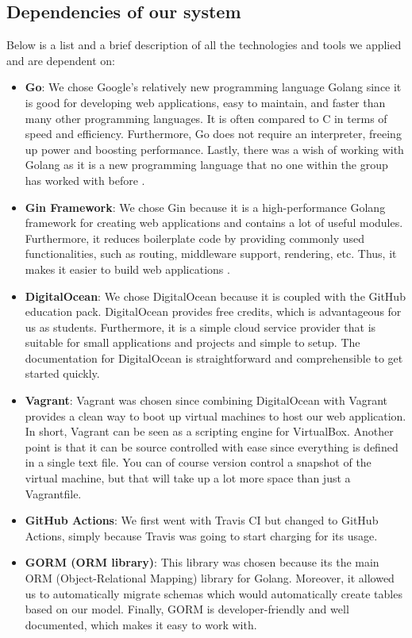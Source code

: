 \subsection{Dependencies of our system}
Below is a list and a brief description of all the technologies and tools we applied and are dependent on:

\begin{itemize}
    \item \textbf{Go}: We chose Google's relatively new programming language Golang since it is good for developing web applications, easy to maintain, and faster than many other programming languages. It is often compared to C in terms of speed and efficiency. Furthermore, Go does not require an interpreter, freeing up power and boosting performance. Lastly, there was a wish of working with Golang as it is a new programming language that no one within the group has worked with before \cite{whyusego}.
    \item \textbf{Gin Framework}: We chose Gin because it is a high-performance Golang framework for creating web applications and contains a lot of useful modules. Furthermore, it reduces boilerplate code by providing commonly used functionalities, such as routing, middleware support, rendering, etc. Thus, it makes it easier to build web applications \cite{gin}. 
    \item \textbf{DigitalOcean}: We chose DigitalOcean because it is coupled with the GitHub education pack. DigitalOcean provides free credits, which is advantageous for us as students. Furthermore, it is a simple cloud service provider that is suitable for small applications and projects and simple to setup. The documentation for DigitalOcean is straightforward and comprehensible to get started quickly. 
    \item \textbf{Vagrant}: Vagrant was chosen since combining DigitalOcean with Vagrant provides a clean way to boot up virtual machines to host our web application. In short, Vagrant can be seen as a scripting engine for VirtualBox. Another point is that it can be source controlled with ease since everything is defined in a single text file. You can of course version control a snapshot of the virtual machine, but that will take up a lot more space than just a Vagrantfile.
    \item \textbf{GitHub Actions}: We first went with Travis CI but changed to GitHub Actions, simply because Travis was going to start charging for its usage. 
    \item \textbf{GORM (ORM library)}: This library was chosen because its the main ORM (Object-Relational Mapping) library for Golang. Moreover, it allowed us to automatically migrate schemas which would automatically create tables based on our model. Finally, GORM is developer-friendly and well documented, which makes it easy to work with. 

\end{itemize}
